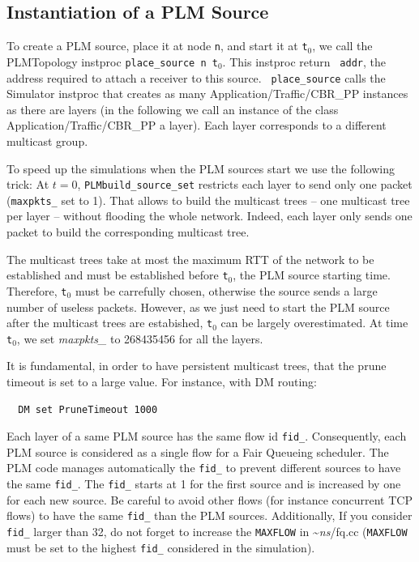 {\subsection{Instantiation of a PLM Source}
To create a PLM source, place it at node {\tt n}, and start it at {\tt t$_0$},  we call
the PLMTopology instproc {\tt place\_source n t$_0$}. This instproc return {\tt
addr}, the address required to attach a receiver to this source. {\tt
place\_source} calls the Simulator instproc  that
creates as many 
Application/Traffic/CBR\_PP instances as there are layers (in the following we call an
instance of the class Application/Traffic/CBR\_PP a layer). Each layer corresponds to a
different multicast group. 

To speed up the simulations when the PLM sources start we use the
following trick:
At $t=0$, {\tt PLMbuild\_source\_set} restricts each
layer to send
only one packet ({\tt maxpkts\_} set to 1). That allows to build the multicast trees
-- one multicast tree per layer -- without flooding the whole network. Indeed,
each layer only sends one packet to build the corresponding multicast tree. 

The multicast trees take at most the maximum RTT of the network to be established and
must be established before {\tt t$_0$}, the PLM source starting time. Therefore,
{\tt t$_0$} must be carrefully chosen, otherwise the source sends a large number of 
useless packets. However, as 
we just need to start the PLM source after the multicast trees are estabished,
{\tt t$_0$} can be largely overestimated. 
At time {\tt t$_0$}, we set {\it maxpkts\_} to 268435456 for all the layers.

It is fundamental, in order to have persistent multicast trees, that the
prune timeout is set to a large value. For instance, with DM routing: 
\begin{verbatim}
  DM set PruneTimeout 1000
\end{verbatim}

Each layer of a same PLM source has the same flow id {\tt fid\_}. Consequently,
each PLM source is considered as a single flow for a Fair Queueing
scheduler. The PLM code manages automatically the {\tt fid\_} to prevent different
sources to have the same {\tt fid\_}. The {\tt fid\_} starts at 1 for the first
source and is increased by one for each new source. Be careful to avoid other
flows (for instance concurrent TCP flows) to have the same {\tt fid\_} than the
PLM sources. Additionally, If you consider {\tt fid\_} larger than 32, do not
forget to increase the {\tt MAXFLOW} in \textasciitilde\emph{ns}/{fq.cc} ({\tt MAXFLOW} must be set
to the highest {\tt fid\_} considered in the simulation).


}
